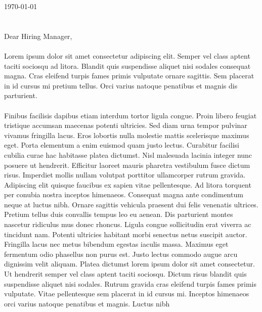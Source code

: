 \documentclass{cover_letter}
\begin{document}
\hline{0.5pt}\vspace{10pt}

\today
\\~\\~\\
Dear Hiring Manager,
\\~\\
Lorem ipsum dolor sit amet consectetur adipiscing elit. Semper vel class aptent taciti sociosqu ad
litora. Blandit quis suspendisse aliquet nisi sodales consequat magna. Cras eleifend turpis fames
primis vulputate ornare sagittis. Sem placerat in id cursus mi pretium tellus. Orci varius natoque
penatibus et magnis dis parturient. \\~\\
Finibus facilisis dapibus etiam interdum tortor ligula congue. Proin libero feugiat tristique
accumsan maecenas potenti ultricies. Sed diam urna tempor pulvinar vivamus fringilla lacus. Eros
lobortis nulla molestie mattis scelerisque maximus eget. Porta elementum a enim euismod quam justo
lectus. Curabitur facilisi cubilia curae hac habitasse platea dictumst. Nisl malesuada lacinia
integer nunc posuere ut hendrerit. Efficitur laoreet mauris pharetra vestibulum fusce dictum risus.
Imperdiet mollis nullam volutpat porttitor ullamcorper rutrum gravida. Adipiscing elit quisque
faucibus ex sapien vitae pellentesque. Ad litora torquent per conubia nostra inceptos himenaeos.
Consequat magna ante condimentum neque at luctus nibh. Ornare sagittis vehicula praesent dui felis
venenatis ultrices. Pretium tellus duis convallis tempus leo eu aenean. Dis parturient montes
nascetur ridiculus mus donec rhoncus. Ligula congue sollicitudin erat viverra ac tincidunt nam.
Potenti ultricies habitant morbi senectus netus suscipit auctor. Fringilla lacus nec metus bibendum
egestas iaculis massa. Maximus eget fermentum odio phasellus non purus est. Justo lectus commodo
augue arcu dignissim velit aliquam. Platea dictumst lorem ipsum dolor sit amet consectetur. Ut
hendrerit semper vel class aptent taciti sociosqu. Dictum risus blandit quis suspendisse aliquet
nisi sodales. Rutrum gravida cras eleifend turpis fames primis vulputate. Vitae pellentesque sem
placerat in id cursus mi. Inceptos himenaeos orci varius natoque penatibus et magnis. Luctus nibh
\end{document}
